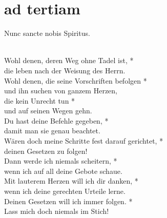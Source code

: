 \thispagestyle{plain}




\section[horae minores]{ad tertiam}

 Nunc sancte nobis Spiritus.
\vspace{0.3cm}



\def\greinitialformat#1{{\fontsize{40}{40}\selectfont #1}}
\gresetfirstlineaboveinitial{\small \textcolor{red}{alef-dalet}}{}
\setaboveinitialseparation{0.72mm}



\vspace{0.3cm}
                   \\
                     
\noindent Wohl denen, deren Weg ohne Tadel ist, *\\
die leben nach der Weisung des Herrn.\\ \vin 
Wohl denen, die seine Vorschriften befolgen *\\ \vin
und ihn suchen von ganzem Herzen,\\
die kein Unrecht tun *\\
und auf seinen Wegen gehn.\\ \vin
Du hast deine Befehle gegeben, *\\ \vin
damit man sie genau beachtet.\\
Wären doch meine Schritte fest darauf gerichtet, *\\
deinen Gesetzen zu folgen!\\ \vin
Dann werde ich niemals scheitern, *\\ \vin
wenn ich auf all deine Gebote schaue.\\
Mit lauterem Herzen will ich dir danken, *\\
wenn ich deine gerechten Urteile lerne.\\ \vin
Deinen Gesetzen will ich immer folgen. *\\ \vin
Lass mich doch niemals im Stich!\\


